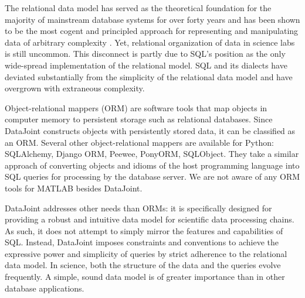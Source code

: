The relational data model has served as the theoretical foundation for the majority of mainstream  database systems for over forty years and has been shown to be the most cogent and principled approach for representing and manipulating data of arbitrary complexity \cite{date_sql_2011}.
Yet, relational organization of data in science labs is still uncommon. 
This disconnect is partly due to SQL's  position as the only wide-spread implementation of the relational model. 
SQL and its dialects have deviated substantially from the simplicity of the relational data model and have overgrown with extraneous complexity.

Object-relational mappers (ORM) are software tools that map objects in computer memory to persistent storage such as relational databases.
Since DataJoint constructs objects with persistently stored data, it can be classified as an ORM.
Several other object-relational mappers are available for Python: SQLAlchemy, Django ORM, Peewee, PonyORM, SQLObject.
They take a similar approach of converting objects and idioms of the host programming language into SQL queries for processing by the database server.
We are not aware of any ORM tools for MATLAB besides DataJoint.

DataJoint addresses other needs than ORMs: it is specifically designed for providing a robust and intuitive data model for scientific data processing chains.
As such, it does not attempt to simply mirror the features and capabilities of SQL.
Instead, DataJoint imposes constraints and conventions to achieve the expressive power and simplicity of queries by strict adherence to the relational data model.
In science, both the structure of the data and the queries evolve frequently. 
A simple, sound data model is of greater importance than in other database applications.

